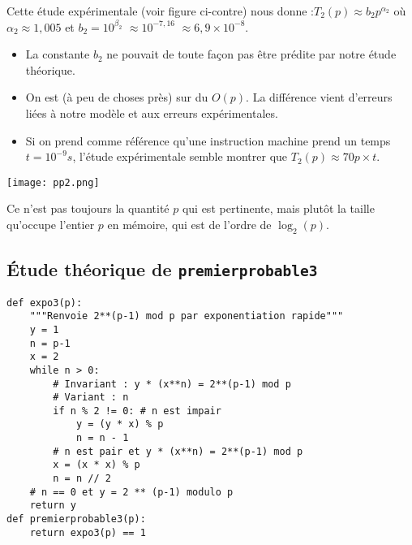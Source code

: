 \begin{minipage}[c]{.48\linewidth}
Cette étude expérimentale (voir figure ci-contre)%
  nous donne :$ T_{2}(p)\approx b_{2} p^{\alpha_{2}}$ où $\alpha_{2}\approx 1,005$ 
   et $b_{2} = 10^{\beta_{2}}$ $\approx 10^{-7,16}$ $\approx 6,9\times 10^{-8}$.

\begin{itemize}
\item[\textbullet] La constante $b_{2}$ ne pouvait de toute façon pas être prédite
  par notre étude théorique.
\item[\textbullet] On est (à peu de choses près) sur du $O(p)$. La différence vient
  d'erreurs liées à notre modèle et aux erreurs expérimentales.
\item[\textbullet] Si on prend comme référence qu'une instruction machine prend
  un temps $t = 10^{-9}s$, l'étude expérimentale semble montrer que
  $T_{2}(p)\approx 70 p \times t$.
\end{itemize}
\end{minipage}\hfill
\begin{minipage}[c]{.48\linewidth}
  \begin{center}
    \texttt{[image: pp2.png]}
 \end{center}
\end{minipage}

\begin{rem}
  Ce n'est pas toujours la quantité $p$ qui est pertinente, mais plutôt la taille qu'occupe l'entier $p$ en mémoire, qui est de l'ordre de $\log_2(p)$.
\end{rem}


\subsection{Étude théorique de \texttt{premierprobable3}}

\begin{lstlisting}
def expo3(p):     
    """Renvoie 2**(p-1) mod p par exponentiation rapide"""
    y = 1
    n = p-1
    x = 2
    while n > 0:
        # Invariant : y * (x**n) = 2**(p-1) mod p
        # Variant : n
        if n % 2 != 0: # n est impair
            y = (y * x) % p
            n = n - 1
        # n est pair et y * (x**n) = 2**(p-1) mod p
        x = (x * x) % p
        n = n // 2
    # n == 0 et y = 2 ** (p-1) modulo p
    return y
def premierprobable3(p):
    return expo3(p) == 1
\end{lstlisting}



